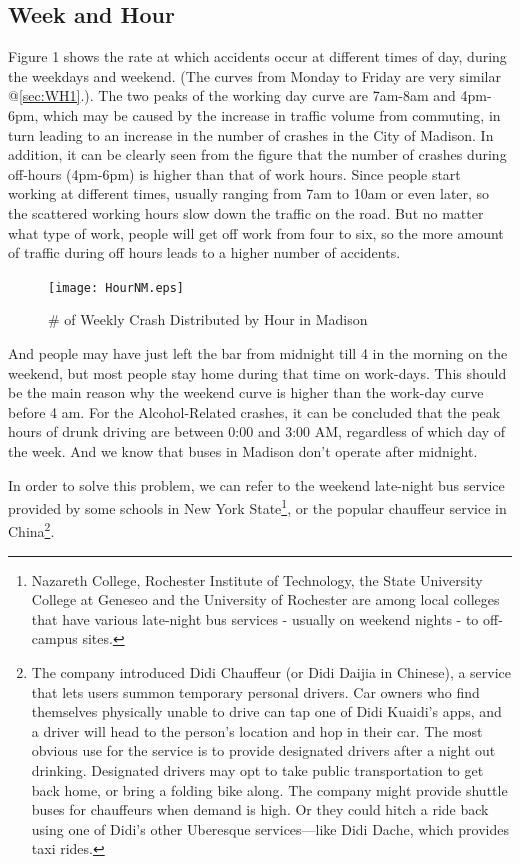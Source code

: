 \documentclass[15pt]{article}
\begin{document}
\subsection{Week and Hour}
\label{sec:WH}
Figure 1 shows the rate at which accidents occur at different times of day, during the weekdays and weekend. (The curves from Monday to Friday are very similar @\ref{sec:WH1}.). The two peaks of the working day curve are 7am-8am and 4pm-6pm, which may be caused by the increase in traffic volume from commuting, in turn leading to an increase in the number of crashes in the City of Madison. In addition, it can be clearly seen from the figure that the number of crashes during off-hours (4pm-6pm) is higher than that of work hours. Since people start working at different times, usually ranging from 7am to 10am or even later, so the scattered working hours slow down the traffic on the road. But no matter what type of work, people will get off work from four to six, so the more amount of traffic during off hours leads to a higher number of accidents. 
\begin{figure}[H]
\centering
\texttt{[image: HourNM.eps]}
\caption{\# of Weekly Crash Distributed by Hour in Madison}
\label{1}
\end{figure}
 And people may have just left the bar from midnight till 4 in the morning on the weekend, but most people stay home during that time on work-days. This should be the main reason why the weekend curve is higher than the work-day curve before 4 am. For the Alcohol-Related crashes, it can be concluded that the peak hours of drunk driving are between 0:00 and 3:00 AM, regardless of which day of the week. And we know that buses in Madison don't operate after midnight.

In order to solve this problem, we can refer to the weekend late-night bus service provided by some schools in New York State\footnote{Nazareth College, Rochester Institute of Technology, the State University College at Geneseo and the University of Rochester are among local colleges that have various late-night bus services - usually on weekend nights - to off-campus sites.}, or the popular chauffeur service in China\footnote{The company introduced Didi Chauffeur (or Didi Daijia in Chinese), a service that lets users summon temporary personal drivers. Car owners who find themselves physically unable to drive can tap one of Didi Kuaidi's apps, and a driver will head to the person's location and hop in their car. The most obvious use for the service is to provide designated drivers after a night out drinking. Designated drivers may opt to take public transportation to get back home, or bring a folding bike along. The company might provide shuttle buses for chauffeurs when demand is high. Or they could hitch a ride back using one of Didi’s other Uberesque services—like Didi Dache, which provides taxi rides.}.
\end{document}
